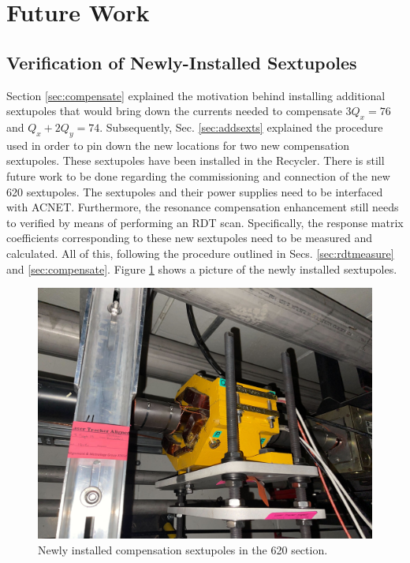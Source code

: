 \section{Future Work}

\subsection{Verification of Newly-Installed Sextupoles}

Section \ref{sec:compensate} explained the motivation behind installing additional sextupoles that would bring down the currents needed to compensate $3Q_x=76$ and $Q_x+ 2Q_y = 74$. Subsequently, Sec. \ref{sec:addsexts} explained the procedure used in order to pin down the new locations for two new compensation sextupoles. These sextupoles have been installed in the Recycler. There is still future work to be done regarding the commissioning and connection of the new 620 sextupoles. The sextupoles and their power supplies need to be interfaced with ACNET. Furthermore, the resonance compensation enhancement still needs to verified by means of performing an RDT scan. Specifically, the response matrix coefficients corresponding to these new sextupoles need to be measured and calculated. All of this, following the procedure outlined in Secs. \ref{sec:rdtmeasure} and \ref{sec:compensate}. Figure \ref{fig:new620sexts} shows a picture of the newly installed sextupoles.

\begin{figure}[H]
    \centering
    \includegraphics[width=\columnwidth]{chapter7/620_sext.jpg}
    \caption{Newly installed compensation sextupoles in the 620 section.}
    \label{fig:new620sexts}
\end{figure}

